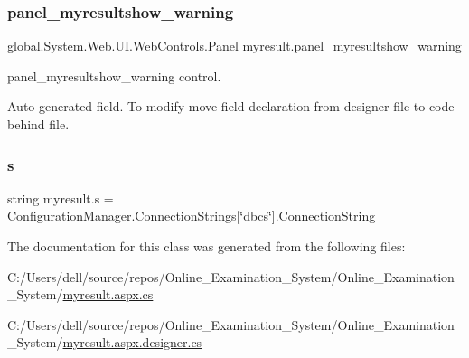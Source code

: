 \subsubsection{\texorpdfstring{panel\_myresultshow\_warning}{panel\_myresultshow\_warning}}
{\footnotesize\ttfamily global.\+System.\+Web.\+U\+I.\+Web\+Controls.\+Panel myresult.\+panel\+\_\+myresultshow\+\_\+warning\hspace{0.3cm}{\ttfamily [protected]}}



panel\+\_\+myresultshow\+\_\+warning control. 

Auto-\/generated field. To modify move field declaration from designer file to code-\/behind file. \mbox{\label{classmyresult_a6ac3ec2abc13b9b8a48c941e63bb0adb}} 
\subsubsection{\texorpdfstring{s}{s}}
{\footnotesize\ttfamily string myresult.\+s = Configuration\+Manager.\+Connection\+Strings\mbox{[}\char`\"{}dbcs\char`\"{}\mbox{]}.Connection\+String\hspace{0.3cm}{\ttfamily [private]}}



The documentation for this class was generated from the following files\+:\begin{DoxyCompactItemize}
\item 
C\+:/\+Users/dell/source/repos/\+Online\+\_\+\+Examination\+\_\+\+System/\+Online\+\_\+\+Examination\+\_\+\+System/\mbox{\hyperlink{myresult_8aspx_8cs}{myresult.\+aspx.\+cs}}\item 
C\+:/\+Users/dell/source/repos/\+Online\+\_\+\+Examination\+\_\+\+System/\+Online\+\_\+\+Examination\+\_\+\+System/\mbox{\hyperlink{myresult_8aspx_8designer_8cs}{myresult.\+aspx.\+designer.\+cs}}\end{DoxyCompactItemize}
